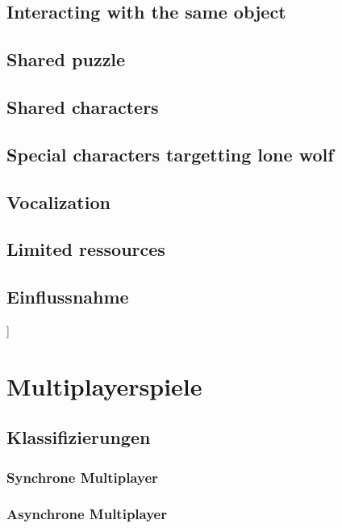 \subsection{Interacting with the same object}

\subsection{Shared puzzle}

\subsection{Shared characters}

\subsection{Special characters targetting lone wolf}

\subsection{Vocalization}

\subsection{Limited ressources}

\subsection{Einflussnahme}
\cite{emmerich_impact_2017}

]
\section{Multiplayerspiele}

\subsection{Klassifizierungen}

\subsubsection{Synchrone Multiplayer}

\subsubsection{Asynchrone Multiplayer}

